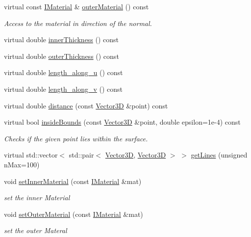 \begin{DoxyCompactItemize}
virtual const \hyperlink{class_d_d_surfaces_1_1_i_material}{I\+Material} \& \hyperlink{class_d_d4hep_1_1_d_d_rec_1_1_vol_surface_base_af05dcf58c48775e1a5a7b0acf59db1c0}{outer\+Material} () const
\begin{DoxyCompactList}\small\item\em Access to the material in direction of the normal. \end{DoxyCompactList}\item 
virtual double \hyperlink{class_d_d4hep_1_1_d_d_rec_1_1_vol_surface_base_af4f950cb7ebf4cef9d35bb5e59d81e8a}{inner\+Thickness} () const
\item 
virtual double \hyperlink{class_d_d4hep_1_1_d_d_rec_1_1_vol_surface_base_a1a5c66bc7c13b15642720ea310b03f6f}{outer\+Thickness} () const
\item 
virtual double \hyperlink{class_d_d4hep_1_1_d_d_rec_1_1_vol_surface_base_aab10f0dd7b5c8e928177bec4caf337c1}{length\+\_\+along\+\_\+u} () const
\item 
virtual double \hyperlink{class_d_d4hep_1_1_d_d_rec_1_1_vol_surface_base_a638bb48002c1108d801c39949ac7d675}{length\+\_\+along\+\_\+v} () const
\item 
virtual double \hyperlink{class_d_d4hep_1_1_d_d_rec_1_1_vol_surface_base_aefb278e0429219871c47b602a2593fef}{distance} (const \hyperlink{class_d_d_surfaces_1_1_vector3_d}{Vector3D} \&point) const
\item 
virtual bool \hyperlink{class_d_d4hep_1_1_d_d_rec_1_1_vol_surface_base_a19dfde80d6e3d0dbe07dc3547dc20925}{inside\+Bounds} (const \hyperlink{class_d_d_surfaces_1_1_vector3_d}{Vector3D} \&point, double epsilon=1e-\/4) const
\begin{DoxyCompactList}\small\item\em Checks if the given point lies within the surface. \end{DoxyCompactList}\item 
virtual std\+::vector$<$ std\+::pair$<$ \hyperlink{class_d_d_surfaces_1_1_vector3_d}{Vector3D}, \hyperlink{class_d_d_surfaces_1_1_vector3_d}{Vector3D} $>$ $>$ \hyperlink{class_d_d4hep_1_1_d_d_rec_1_1_vol_surface_base_ad0863cf8ceb6a443a048fe89cdc79f26}{get\+Lines} (unsigned n\+Max=100)
\item 
void \hyperlink{class_d_d4hep_1_1_d_d_rec_1_1_vol_surface_base_aa886f2e4301c3093eddbcd6c07ca7f0a}{set\+Inner\+Material} (const \hyperlink{class_d_d_surfaces_1_1_i_material}{I\+Material} \&mat)
\begin{DoxyCompactList}\small\item\em set the inner Material \end{DoxyCompactList}\item 
void \hyperlink{class_d_d4hep_1_1_d_d_rec_1_1_vol_surface_base_aa06c021dd2374985054c08648100b45a}{set\+Outer\+Material} (const \hyperlink{class_d_d_surfaces_1_1_i_material}{I\+Material} \&mat)
\begin{DoxyCompactList}\small\item\em set the outer Materal \end{DoxyCompactList}\end{DoxyCompactItemize}
